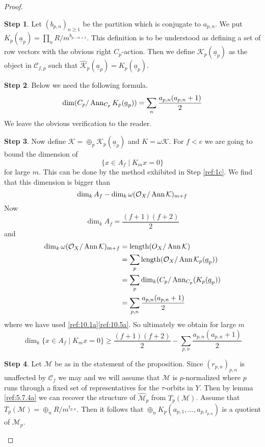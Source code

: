 \documentclass{amsproc}
\def\Cscr{{\mathcal C}}
\def\Kscr{{\mathcal K}}
\def\Mscr{{\mathcal M}}
\def\Oscr{{\mathcal O}}
\def\Ann{\mathop{\text{Ann}}\nolimits}
\let\oldtext\text
\def\text#1{\oldtext{\upshape #1}}
\DeclareMathOperator{\length}{length}
\theoremstyle{definition}
\newtheorem{step}{Step}
\theoremstyle{remark}
\numberwithin{equation}{section}
\numberwithin{table}{section}
\numberwithin{figure}{section}
\begin{document}
\begin{proof}
\begin{step}
Let $(b_{p,n})_{n\ge 1}$ be the partition which is conjugate to $a_{p,n}$.
We put $K_p(\underline{a}_p)=\prod_n
R/m^{b_{p,-n+1}}$. This definition is to be understood as defining a
  set of row vectors with the obvious right $C_p$-action.  Then we
  define $\Kscr_p(\underline{a}_p)$ as the object in $\Cscr_{f,p}$ such
  that $\hat{\Kscr}_p(\underline{a}_p)=K_p(\underline{a}_p)$.  
\end{step}
\begin{step} Below we need the following formula.
\begin{equation}
\label{ref:10.5a}
\dim (C_p/\Ann_{C_p}K_p(\underline{a}_p))=\sum_n
\frac{a_{p,n}(a_{p,n}+1)}{2}
\end{equation}
We leave the obvious verification to the reader. 
\end{step}
\begin{step}
\label{ref:5c}
  Now define $\Kscr=\oplus_p \Kscr_p(\underline{a}_p)$ and $K=\omega
  \Kscr$. 
For $f<e$ we are going to bound the dimension of 
\[
\{x\in A_f\mid K_{m} x=0\}
\]
for large $m$. This can be done by the method exhibited in Step
\ref{ref:1c}. We find that this dimension is bigger than
\[
\dim_k A_f-\dim_k \omega (\Oscr_X/\Ann \Kscr)_{m+f}
\]
Now
\[
\dim_k A_f=\frac{(f+1)(f+2)}{2}
\]
and 
\begin{align*}
\dim _k \omega (\Oscr_X/\Ann \Kscr)_{m+f}&=\length (O_X/\Ann \Kscr)\\
&=\sum_p\length (\Oscr_X/\Ann \Kscr_p(\underline{a}_p))\\
&=\sum_p \dim_k (C_p /\Ann_{C_p}(K_p(\underline{a}_p))\\
&=\sum_{p,n} \frac{a_{p,n}(a_{p,n}+1)}{2}
\end{align*}
where we have used
\eqref{ref:10.1a}\eqref{ref:10.5a}. So ultimately
we obtain for large $m$
\[
\dim_k\{x\in A_f\mid K_{m} x=0\}
\ge \frac{(f+1)(f+2)}{2}-\sum_{p,n} \frac{a_{p,n}(a_{p,n}+1)}{2}
\]
\end{step}
\begin{step}
\label{ref:6b}
Let $\Mscr$ be as in the statement of the proposition. Since
$(r_{p,n})_{p,n}$ is unaffected by $\Cscr_{f}$ we may and we will assume
that $\Mscr$ is $p$-normalized where $p$ runs through a fixed set of
representatives for the $\tau$-orbits in $Y$.  Then by lemma
\ref{ref:5.7.4a} we can recover the structure of $\hat{\Mscr}_p$ from
$T_p(\Mscr)$. Assume that $T_p(\Mscr)=\oplus_n R/m^{t_{p,n}}$. Then it
follows that $\oplus_n K_p(a_{p,1},\ldots,a_{p,t_{p,n}})$ is a
quotient of $\hat{\Mscr}_p$.


\end{step}
\end{proof}
\end{document}
